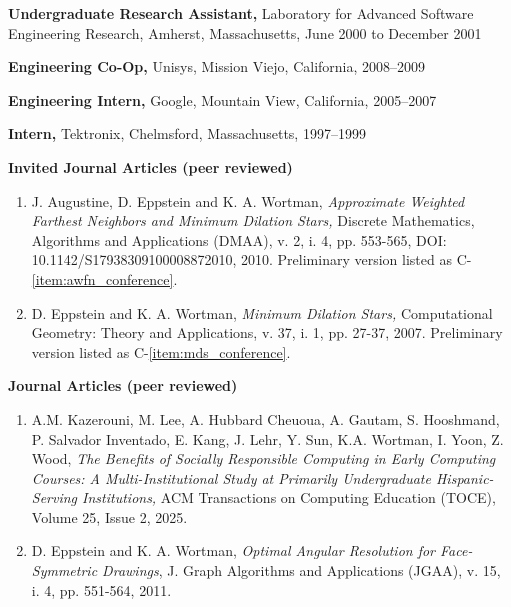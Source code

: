 \documentclass[11pt]{letter}
\begin{document}
\textbf{Undergraduate Research Assistant,} Laboratory for Advanced Software Engineering Research, Amherst, Massachusetts, June 2000 to December 2001


\textbf{Engineering Co-Op,} Unisys, Mission Viejo, California, 2008--2009 %

\textbf{Engineering Intern,} Google, Mountain View, California, 2005--2007 %

\textbf{Intern,} Tektronix, Chelmsford, Massachusetts, 1997--1999 %

\clearpage
{}

\renewcommand{\labelenumi}{I-\arabic{enumi}.}
\textbf{Invited Journal Articles (peer reviewed)}
\begin{enumerate}
\item \label{item:awfn_journal} J. Augustine, D. Eppstein and K. A. Wortman, \emph{Approximate Weighted Farthest Neighbors and Minimum Dilation Stars,} Discrete Mathematics, Algorithms and Applications (DMAA), v. 2, i. 4, pp. 553-565, DOI: 10.1142/S17938309100008872010, 2010.  Preliminary version listed as C-\ref{item:awfn_conference}.
\item \label{item:mds_journal} D. Eppstein and K. A. Wortman, \emph{Minimum Dilation Stars,} Computational Geometry: Theory and Applications, v. 37, i. 1, pp. 27-37, 2007.  Preliminary version listed as C-\ref{item:mds_conference}.
\end{enumerate}

\renewcommand{\labelenumi}{J-\arabic{enumi}.}
\textbf{Journal Articles (peer reviewed)}
\begin{enumerate}
  \item \label{item:toce25etal} A.M. Kazerouni, M. Lee, A. Hubbard Cheuoua, A. Gautam, S. Hooshmand, P. Salvador Inventado, E. Kang, J. Lehr, Y. Sun, K.A. Wortman, I. Yoon, Z. Wood, \emph{The Benefits of Socially Responsible Computing in Early Computing Courses: A Multi-Institutional Study at Primarily Undergraduate Hispanic-Serving Institutions,} ACM Transactions on Computing Education (TOCE), Volume 25, Issue 2, 2025.
  \item \label{item:oarpdsf_journal} D. Eppstein and K. A. Wortman, \emph{Optimal Angular Resolution for Face-Symmetric Drawings}, J. Graph Algorithms and Applications (JGAA), v. 15, i. 4, pp. 551-564, 2011.
\end{enumerate}
\end{document}
